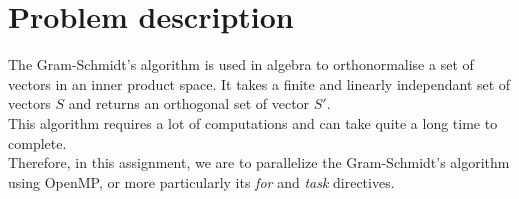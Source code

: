 \chapter{Problem description}

The Gram-Schmidt's algorithm is used in algebra to orthonormalise a set of vectors in an inner product space. It takes a finite and linearly independant set of vectors $S$ and returns an orthogonal set of vector $S'$.\\

This algorithm requires a lot of computations and can take quite a long time to complete.\\

Therefore, in this assignment, we are to parallelize the Gram-Schmidt's algorithm using OpenMP, or more particularly its \textit{for} and \textit{task} directives.
